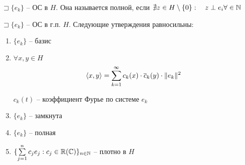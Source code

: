 \begin{definition}
    $\sqsupset \{e_k\}$ -- ОС в $H$. Она называется полной, если $\nexists z\in H \setminus \{0\}:\quad z\perp e_i \forall \in \mathbb{N} $
\end{definition}

\begin{theorem}
    $\sqsupset \{e_k\}$ -- ОС в г.п. $H$. Следующие утверждения равносильны:
    \begin{enumerate}
        \item $\{e_k\}$ -- базис
        \item $\forall x, y\in H$
        \[ \left<x, y \right> = \sum_{k=1}^{\infty } c_k(x) \cdot \ov c_k(y)\cdot \|e_k\|^2 \]

        $c_k(t)$ -- коэффициент Фурье по системе $e_k$
        \item $\{e_k\}$ -- замкнута
        \item $\{e_k\}$ -- полная
        \item $\{\sum_{j=1}^{n} c_je_j: c_j\in \R(\C)\}_{n\in \N }$ -- плотно в $H$
    \end{enumerate}
\end{theorem}

